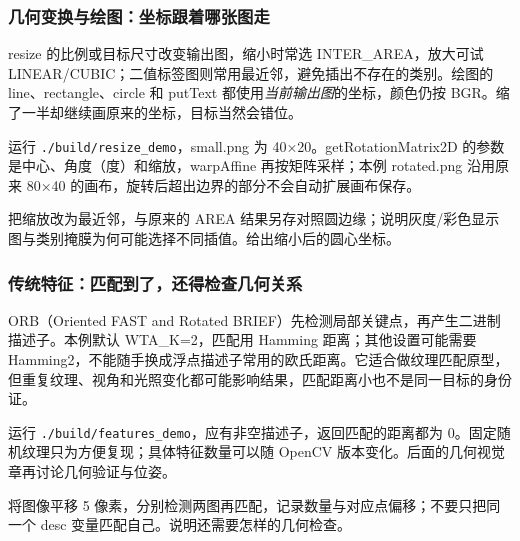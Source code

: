 \subsubsection{几何变换与绘图：坐标跟着哪张图走}
resize 的比例或目标尺寸改变输出图，缩小时常选 INTER\_AREA，放大可试 LINEAR/CUBIC；二值标签图则常用最近邻，避免插出不存在的类别。绘图的 line、rectangle、circle 和 putText 都使用\emph{当前输出图}的坐标，颜色仍按 BGR。缩了一半却继续画原来的坐标，目标当然会错位。
\begin{example}[缩放，再绕中心旋转]
运行 \texttt{./build/resize\_demo}，small.png 为 40×20。getRotationMatrix2D 的参数是中心、角度（度）和缩放，warpAffine 再按矩阵采样；本例 rotated.png 沿用原来 80×40 的画布，旋转后超出边界的部分不会自动扩展画布保存。
\begin{cvblock}

\end{cvblock}
\end{example}
\begin{exercise}\label{ex:v2-cv-resize}
把缩放改为最近邻，与原来的 AREA 结果另存对照圆边缘；说明灰度/彩色显示图与类别掩膜为何可能选择不同插值。给出缩小后的圆心坐标。
\end{exercise}

\subsubsection{传统特征：匹配到了，还得检查几何关系}
ORB（Oriented FAST and Rotated BRIEF）先检测局部关键点，再产生二进制描述子。本例默认 WTA\_K=2，匹配用 Hamming 距离；其他设置可能需要 Hamming2，不能随手换成浮点描述子常用的欧氏距离。它适合做纹理匹配原型，但重复纹理、视角和光照变化都可能影响结果，匹配距离小也不是同一目标的身份证。
\begin{example}[先让图像和自己匹配]
运行 \texttt{./build/features\_demo}，应有非空描述子，返回匹配的距离都为 0。固定随机纹理只为方便复现；具体特征数量可以随 OpenCV 版本变化。后面的几何视觉章再讨论几何验证与位姿。
\begin{cvblock}

\end{cvblock}
\end{example}
\begin{exercise}\label{ex:v2-cv-features}
将图像平移 5 像素，分别检测两图再匹配，记录数量与对应点偏移；不要只把同一个 desc 变量匹配自己。说明还需要怎样的几何检查。
\end{exercise}

